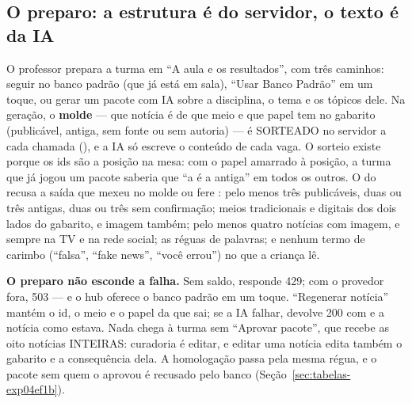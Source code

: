 \subsection{O preparo: a estrutura é do servidor, o texto é da IA}

O professor prepara a turma em \enquote{A aula e os resultados}, com três
caminhos: seguir no banco padrão (que já está em sala), \enquote{Usar Banco
Padrão} em um toque, ou gerar um pacote com IA sobre a disciplina, o tema e os
tópicos dele. Na geração, o \textbf{molde} --- que notícia é de que meio e que
papel tem no gabarito (publicável, antiga, sem fonte ou sem autoria) --- é
SORTEADO no servidor a cada chamada (), e a IA só escreve o
conteúdo de cada vaga. O sorteio existe porque os ids são a posição na mesa:
com o papel amarrado à posição, a turma que já jogou um pacote saberia que
\enquote{a  é a antiga} em todos os outros. O  do
 recusa a saída que mexeu no molde ou fere
: pelo menos três publicáveis, duas ou três antigas, duas
ou três sem confirmação; meios tradicionais e digitais dos dois lados do
gabarito, e imagem também; pelo menos quatro notícias com imagem, e sempre na
TV e na rede social; as réguas de palavras; e nenhum termo de carimbo
(\enquote{falsa}, \enquote{fake news}, \enquote{você errou}) no que a criança
lê.

\textbf{O preparo não esconde a falha.} Sem saldo, 
responde 429; com o provedor fora, 503 --- e o hub oferece o banco padrão em um
toque. \enquote{Regenerar notícia} mantém o id, o meio e o papel da que sai; se
a IA falhar, devolve 200 com  e a notícia como estava. Nada
chega à turma sem \enquote{Aprovar pacote}, que recebe as oito notícias
INTEIRAS: curadoria é editar, e editar uma notícia edita também o gabarito e a
consequência dela. A homologação passa pela mesma régua, e o pacote  sem
quem o aprovou é recusado pelo banco (Seção~\ref{sec:tabelas-exp04ef1b}).

